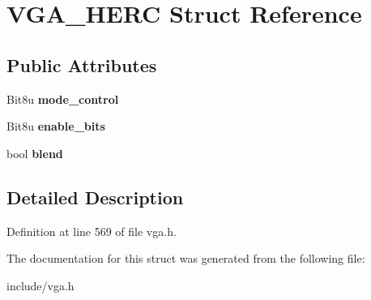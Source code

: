 \hypertarget{structVGA__HERC}{\section{V\-G\-A\-\_\-\-H\-E\-R\-C Struct Reference}
\label{structVGA__HERC}
}
\subsection*{Public Attributes}
\begin{DoxyCompactItemize}
\item 
\hypertarget{structVGA__HERC_ab6ac3f557c940847cfadec99c7f71c74}{Bit8u {\bfseries mode\-\_\-control}}\label{structVGA__HERC_ab6ac3f557c940847cfadec99c7f71c74}

\item 
\hypertarget{structVGA__HERC_a3583e1934895677bfdf4cd907b81c479}{Bit8u {\bfseries enable\-\_\-bits}}\label{structVGA__HERC_a3583e1934895677bfdf4cd907b81c479}

\item 
\hypertarget{structVGA__HERC_af5435dbc6b4458a9565c18d05741f979}{bool {\bfseries blend}}\label{structVGA__HERC_af5435dbc6b4458a9565c18d05741f979}

\end{DoxyCompactItemize}


\subsection{Detailed Description}


Definition at line 569 of file vga.\-h.



The documentation for this struct was generated from the following file\-:\begin{DoxyCompactItemize}
\item 
include/vga.\-h\end{DoxyCompactItemize}
